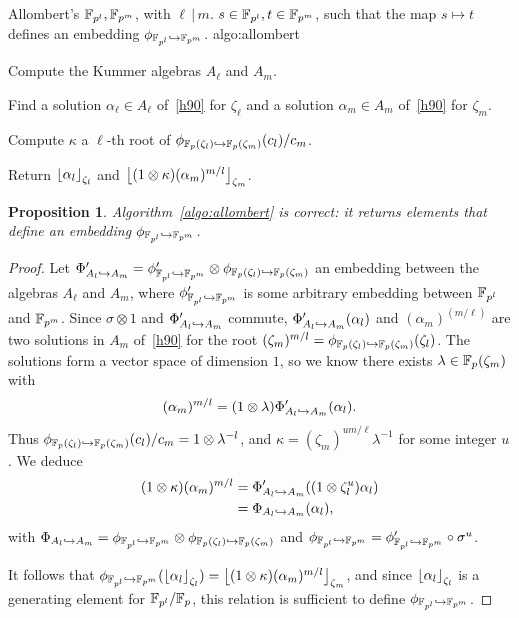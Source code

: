 \documentclass{sig-alternate}
\newtheorem{proposition}{Proposition}
\begin{document}
\begin{algorithm_endline}
  {Allombert's}
  {$\mathbb{F}_{p^l}, \mathbb{F}_{p^m}$, with $\ell\,|\,m$.}
  {$s\in\mathbb{F}_{p^l}, t\in\mathbb{F}_{p^m}$, such that the map $s\mapsto t$
  defines an embedding $\phi_{\mathbb{F}_{p^{l}}\hookrightarrow\mathbb{F}_{p^{m}}}$.}
  {algo:allombert}
\item Compute the Kummer algebras $A_\ell$ and $A_m$.
\item Find a solution $\alpha_\ell\in A_\ell$ of~\eqref{h90} for $\zeta_\ell$
  and a solution $\alpha_m\in A_m$ of~\eqref{h90} for $\zeta_m$.
\item Compute $\kappa$ a $\ell$-th root of $\phi_{\mathbb{F}_{p}(\zeta_{l})\hookrightarrow\mathbb{F}_{p}(\zeta_{m})}(c_l)/c_m$.
\item Return $\left\lfloor \alpha_{l} \right\rfloor_{\zeta_l}$ and $\left\lfloor (1\otimes\kappa)(\alpha_m)^{m/l} \right\rfloor_{\zeta_m}$.
\end{algorithm_endline}

\begin{proposition}
  Algorithm~\ref{algo:allombert} is correct: it returns elements that define an
  embedding $\phi_{\mathbb{F}_{p^{l}}\hookrightarrow\mathbb{F}_{p^{m}}}$.
\end{proposition}
\begin{proof}
  Let $\Phi_{A_{l}\hookrightarrow A_{m}}'=\phi_{\mathbb{F}_{p^{l}}\hookrightarrow\mathbb{F}_{p^{m}}}'\otimes\phi_{\mathbb{F}_{p}(\zeta_{l})\hookrightarrow\mathbb{F}_{p}(\zeta_{m})}$ an embedding
  between the algebras $A_\ell$ and $A_m$, where $\phi_{\mathbb{F}_{p^{l}}\hookrightarrow\mathbb{F}_{p^{m}}}'$ is some
  arbitrary embedding between $\mathbb{F}_{p^l}$ and $\mathbb{F}_{p^m}$.
  Since $\sigma\otimes1$ and $\Phi_{A_{l}\hookrightarrow A_{m}}'$ commute,
  $\Phi_{A_{l}\hookrightarrow A_{m}}'(\alpha_l)$ and $(\alpha_m)^{(m/\ell)}$ are two solutions
  in $A_m$ of~\eqref{h90} for the root $(\zeta_m)^{m/l} =
  \phi_{\mathbb{F}_{p}(\zeta_{l})\hookrightarrow\mathbb{F}_{p}(\zeta_{m})}(\zeta_l)$. The solutions form a vector space of
  dimension $1$, so we know there exists $\lambda\in\mathbb{F}_{p}(\zeta_m)$
  with
  \[
    (\alpha_m)^{m/l} = (1\otimes\lambda)\Phi_{A_{l}\hookrightarrow A_{m}}'(\alpha_l).
  \]
Thus $\phi_{\mathbb{F}_{p}(\zeta_{l})\hookrightarrow\mathbb{F}_{p}(\zeta_{m})}(c_l)/c_m=1\otimes\lambda^{-l}$,
and $\kappa = (\zeta_{m})^{um/\ell}\lambda^{-1}$ for some integer $u$.
We deduce
  \begin{align*}
    (1\otimes\kappa)(\alpha_m)^{m/l} &= \Phi_{A_{l}\hookrightarrow A_{m}}'((1\otimes\zeta_l^u)\alpha_l)\\
    &= \Phi_{A_{l}\hookrightarrow A_{m}}(\alpha_l),
  \end{align*}
  with $\Phi_{A_{l}\hookrightarrow A_{m}}=\phi_{\mathbb{F}_{p^{l}}\hookrightarrow\mathbb{F}_{p^{m}}}\otimes\phi_{\mathbb{F}_{p}(\zeta_{l})\hookrightarrow\mathbb{F}_{p}(\zeta_{m})}$ and
  $\phi_{\mathbb{F}_{p^{l}}\hookrightarrow\mathbb{F}_{p^{m}}} = \phi_{\mathbb{F}_{p^{l}}\hookrightarrow\mathbb{F}_{p^{m}}}'\circ\sigma^u$.

It follows that
  $\phi_{\mathbb{F}_{p^{l}}\hookrightarrow\mathbb{F}_{p^{m}}}(\left\lfloor \alpha_{l} \right\rfloor_{\zeta_l})=\left\lfloor (1\otimes\kappa)(\alpha_m)^{m/l} \right\rfloor_{\zeta_m}$,
and since $\left\lfloor \alpha_{l} \right\rfloor_{\zeta_l}$ is a generating element for
  $\mathbb{F}_{p^l}/\mathbb{F}_{p}$, this relation is sufficient to define
  $\phi_{\mathbb{F}_{p^{l}}\hookrightarrow\mathbb{F}_{p^{m}}}$.
\end{proof}
\end{document}
